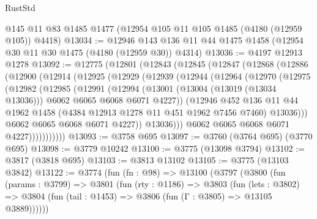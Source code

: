 \begin{lexlean}{RustStd}
\begin{coremodule}
{\begin{coremodule}
{{{{{{{{{{{{{{{{{{{{{{{{{{{{{{{    @145
    @11
    @83
    @1485
    @1477
    (@12954 @105 @11 @105 @1485 (@4180 (@12959 @105)) @4418)
@13034 := @12946 @143 @136 @11 @44 @1475 @1458 (@12954 @30 @11 @30 @1475 (@4180 (@12959 @30)) @4314)
@13036 := @4197 @12913 @1278
@13092 := @12775
    (@12801
      (@12843
        (@12845
          (@12847
            (@12868
              (@12886
                (@12900
                  (@12914
                    (@12925
                      (@12929
                        (@12939
                          (@12944
                            (@12964
                              (@12970
                                (@12975
                                  (@12982
                                    (@12985
                                      (@12991
                                        (@12994
                                          (@13001
                                            (@13004 (@13019 (@13034 @13036)))
                                            @6062
                                            @6065
                                            @6068
                                            @6071
                                            @4227))
                                        (@12946
                                          @452
                                          @136
                                          @11
                                          @44
                                          @1962
                                          @1458
                                          (@4384 @12913 @1278 @11 @451 @1962 @7456 @7460)
                                          @13036)))
                                    @6062
                                    @6065
                                    @6068
                                    @6071
                                    @4227))
                                @13036)))
                          @6062
                          @6065
                          @6068
                          @6071
                          @4227)))))))))))
@13093 := @3758 @695
@13097 := @3760 (@3764 @695) (@3770 @695)
@13098 := @3779 @10242
@13100 := @3775 (@13098 @3794)
@13102 := @3817 (@3818 @695)
@13103 := @3813 @13102
@13105 := @3775 (@13103 @3842)
@13122 := @3774
    (fun (fn : @98) =>
    @13100
      (@3797
        (@3800
          (fun (params : @3799) =>
          @3801
            (fun (rty : @1186) =>
            @3803
              (fun (lets : @3802) =>
              @3804 (fun (tail : @1453) => @3806 (fun (Γ : @3805) => @13105 @3889))))))
}}}}}}}}}}}}}}}}}}}}}}}}}}}}}}}
\end{coremodule}}
\end{coremodule}
\end{lexlean}
